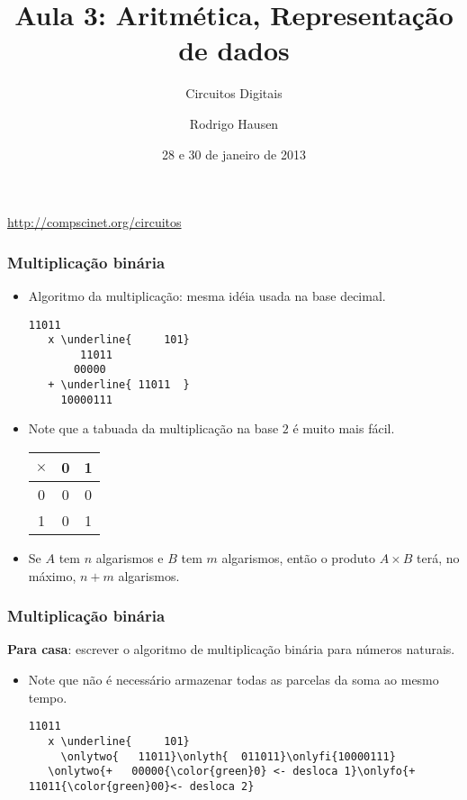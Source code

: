 \documentclass{beamer}
\title{Aula 3: Aritmética, Representação de dados}
\subtitle{Circuitos Digitais}
\author{Rodrigo Hausen}
\institute{CMCC -- UFABC}
\date{28 e 30 de janeiro de 2013}
\begin{document}
\begin{frame}
\maketitle

\vspace{-1cm}

\begin{center}
\url{http://compscinet.org/circuitos}
\end{center}

\end{frame}


\begin{frame}[fragile]
\frametitle{Multiplicação binária}

\begin{itemize}
\item Algoritmo da multiplicação: mesma idéia usada na base decimal.
\begin{Verbatim}[commandchars=\\\{\},codes={\catcode`$=3\catcode`^=7}]
        11011
   x \underline{     101}
        11011
       00000
   + \underline{ 11011  }
     10000111
\end{Verbatim}
\pause
\item Note que a tabuada da multiplicação na base $2$ é muito mais fácil.
\begin{center}
\begin{tabular}{c|cc}
$\times$ & 0 & 1 \\
\hline
       0 & 0 & 0 \\
       1 & 0 & 1
\end{tabular}
\end{center}
\pause
\item Se $A$ tem $n$ algarismos e $B$ tem $m$ algarismos, então o produto $A \times B$ terá, no máximo, \pause $n+m$ algarismos.
\end{itemize}

\end{frame}

\begin{frame}[fragile]
\frametitle{Multiplicação binária}

\textbf{Para casa}: escrever o algoritmo de multiplicação binária para números naturais.

\newcommand{\onlytwo}[1]{\only<2>{#1}}
\newcommand{\onlyth}[1]{\only<3-4>{#1}}
\newcommand{\onlyfo}[1]{\only<4>{#1}}
\newcommand{\onlyfi}[1]{\only<5>{#1}}

\begin{itemize}
\item Note que não é necessário armazenar todas as parcelas da soma ao mesmo tempo.
\begin{Verbatim}[commandchars=\\\{\},codes={\catcode`$=3\catcode`^=7}]
        11011
   x \underline{     101}
     \onlytwo{   11011}\onlyth{  011011}\onlyfi{10000111}
   \onlytwo{+   00000{\color{green}0} <- desloca 1}\onlyfo{+  11011{\color{green}00}<- desloca 2}
\end{Verbatim}
\end{itemize}
\end{frame}
\end{document}
